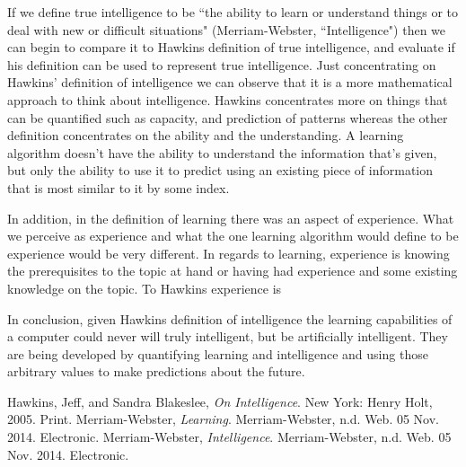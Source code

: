 \documentclass[11pt, oneside]{article}
\begin{document}

\par 
If we define true intelligence to be ``the ability to learn or understand things or to deal with new or difficult situations" (Merriam-Webster, ``Intelligence") then we can begin to compare it to Hawkins definition of true intelligence, and evaluate if his definition can be used to represent true intelligence. Just concentrating on Hawkins' definition of intelligence we can observe that it is a more mathematical approach to think about intelligence. Hawkins concentrates more on things that can be quantified such as capacity, and prediction of patterns whereas the other definition concentrates on the ability and the understanding. A learning algorithm doesn't have the ability to understand the information that's given, but only the ability to use it to predict using an existing piece of information that is most similar to it by some index. 


\par In addition, in the definition of learning there was an aspect of experience. What we perceive as experience and what the one learning algorithm would define to be experience would be very different. In regards to learning, experience is knowing the prerequisites to the topic at hand or having had experience and some existing knowledge on the topic. To Hawkins experience is 

\par 

\par In conclusion, given Hawkins definition of intelligence the learning capabilities of a computer could never will truly intelligent, but be artificially intelligent. They are being developed by quantifying learning and intelligence and using those arbitrary values to make predictions about the future. 

\begin{thebibliography}{9}
  Hawkins, Jeff, and Sandra Blakeslee,
  \emph{On Intelligence}.
  New York: Henry Holt, 2005.
  Print.
  Merriam-Webster,
  \emph{Learning}.
  Merriam-Webster, n.d. Web. 05 Nov. 2014.
  Electronic.
  Merriam-Webster,
  \emph{Intelligence}.
  Merriam-Webster, n.d. Web. 05 Nov. 2014.
  Electronic.
\end{thebibliography}
\end{document}
